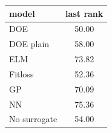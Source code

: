 \begin{tabular}{|lc|}
\hline
model & last rank\\
\hline
DOE & 50.00 \\
DOE plain & 58.00 \\
ELM & 73.82 \\
Fitloss & 52.36 \\
GP & 70.09 \\
NN & 75.36 \\
No surrogate & 54.00 \\
\hline
\end{tabular}
